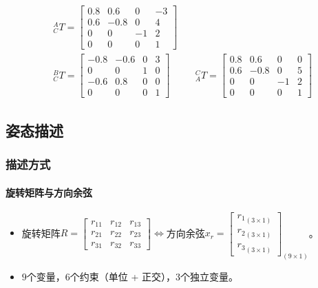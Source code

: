 \documentclass[
12pt, %
a4paper, 
oneside, %
headinclude,footinclude, %
]{scrartcl}
\begin{document}
\begin{itemize}
\begin{align*}
&{}^A_C T = \begin{bmatrix} 0.8 & 0.6 & 0 & -3 \\ 0.6 & -0.8 & 0 & 4 \\ 0 & 0 & -1 & 2 \\ 0 & 0 & 0 & 1 \end{bmatrix} \\
&{}^B_C T = \begin{bmatrix} -0.8 & -0.6 & 0 & 3 \\ 0 & 0 & 1 & 0 \\ -0.6 & 0.8 & 0 & 0 \\ 0 & 0 & 0 & 1 \end{bmatrix} \quad &
&{}^C_A T = \begin{bmatrix} 0.8 & 0.6 & 0 & 0 \\ 0.6 & -0.8 & 0 & 5 \\ 0 & 0 & -1 & 2 \\ 0 & 0 & 0 & 1 \end{bmatrix}
\end{align*}
\end{itemize}
\subsection[姿态描述]{姿态描述}
\subsubsection[描述方式]{描述方式}
\paragraph{旋转矩阵与方向余弦}
\begin{itemize}
\item 旋转矩阵$ R = \begin{bmatrix} r_{11} & r_{12} & r_{13} \\ r_{21} & r_{22} & r_{23} \\ r_{31} & r_{32} & r_{33} \end{bmatrix} $$ \Leftrightarrow $方向余弦$ x_r = \begin{bmatrix} {r_1}_{(3 \times 1)} \\ {r_2}_{(3 \times 1)} \\ {r_3}_{(3 \times 1)} \end{bmatrix}_{(9 \times 1)} $。
\item $ 9 $个变量，$ 6 $个约束（单位 + 正交），$ 3 $个独立变量。
\end{itemize}
\end{document}
